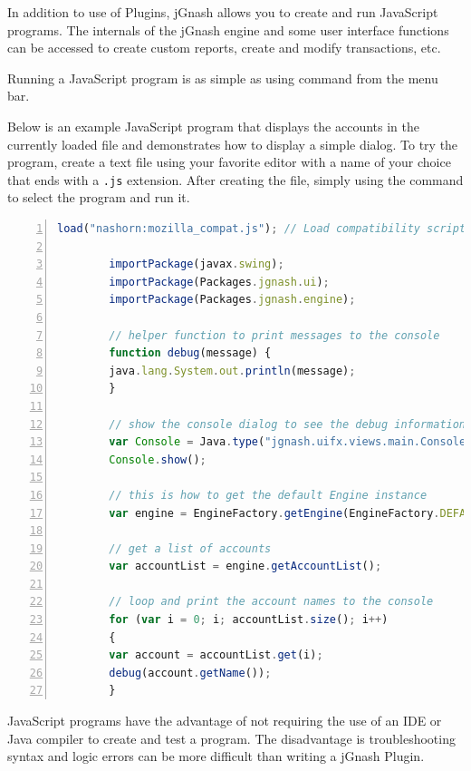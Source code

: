 \documentclass[letterpaper,12pt]{book}
\begin{document}
    In addition to use of Plugins, jGnash allows you to create and run JavaScript programs.
    The internals of the jGnash engine and some user interface functions can be accessed to create custom reports, create
    and modify transactions, etc.

    Running a JavaScript program is as simple as using  command from the menu bar.

    Below is an example JavaScript program that displays the accounts in the currently loaded file and demonstrates how to
    display a simple dialog.
    To try the program, create a text file using your favorite editor with a name of your choice that ends with
    a \texttt{.js} extension.
    After creating the file, simply using the  command to select the program and run it.
    \\
    \begin{lstlisting}[language=JavaScript,numbers=left]
        load("nashorn:mozilla_compat.js"); // Load compatibility script

        importPackage(javax.swing);
        importPackage(Packages.jgnash.ui);
        importPackage(Packages.jgnash.engine);

        // helper function to print messages to the console
        function debug(message) {
        java.lang.System.out.println(message);
        }

        // show the console dialog to see the debug information
        var Console = Java.type("jgnash.uifx.views.main.ConsoleDialogController");
        Console.show();

        // this is how to get the default Engine instance
        var engine = EngineFactory.getEngine(EngineFactory.DEFAULT);

        // get a list of accounts
        var accountList = engine.getAccountList();

        // loop and print the account names to the console
        for (var i = 0; i; accountList.size(); i++)
        {
        var account = accountList.get(i);
        debug(account.getName());
        }
    \end{lstlisting}


    JavaScript programs have the advantage of not requiring the use of an IDE or Java compiler to create and test a program.
    The disadvantage is troubleshooting syntax and logic errors can be more difficult than writing a jGnash Plugin.
\end{document}

